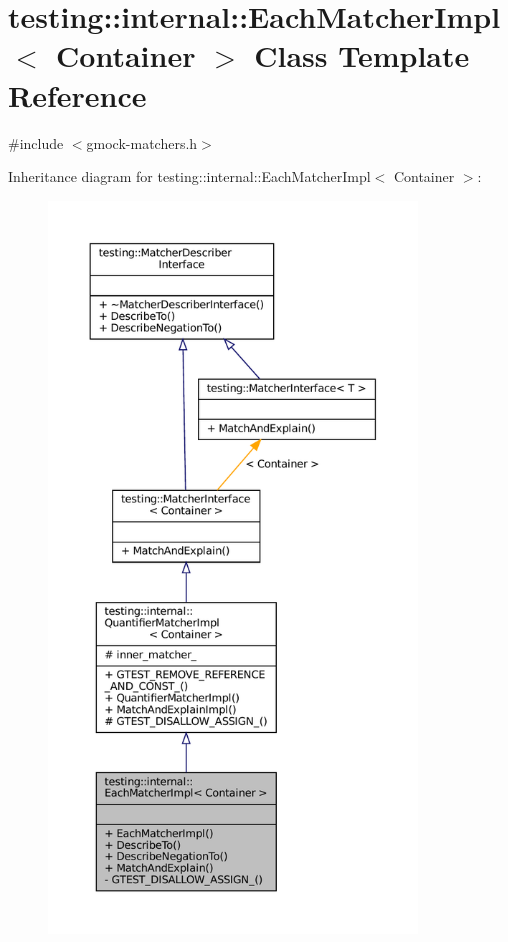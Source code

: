 \hypertarget{classtesting_1_1internal_1_1EachMatcherImpl}{}\section{testing\+:\+:internal\+:\+:Each\+Matcher\+Impl$<$ Container $>$ Class Template Reference}
\label{classtesting_1_1internal_1_1EachMatcherImpl}


{\ttfamily \#include $<$gmock-\/matchers.\+h$>$}



Inheritance diagram for testing\+:\+:internal\+:\+:Each\+Matcher\+Impl$<$ Container $>$\+:
\nopagebreak
\begin{figure}[H]
\begin{center}
\leavevmode
\includegraphics[height=550pt]{classtesting_1_1internal_1_1EachMatcherImpl__inherit__graph}
\end{center}
\end{figure}


